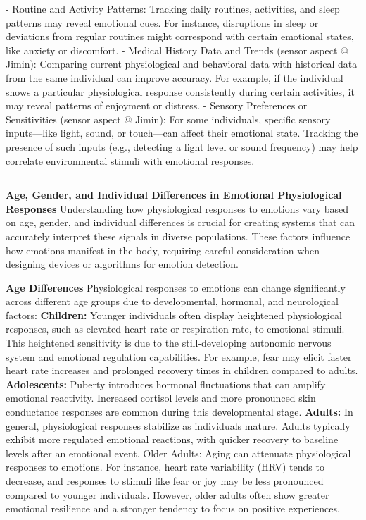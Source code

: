 \documentclass[12pt, research paper]{report}
\begin{document}
	\newline - Routine and Activity Patterns: Tracking daily routines, activities, and sleep patterns may reveal emotional cues. For instance, disruptions in sleep or deviations from regular routines might correspond with certain emotional states, like anxiety or discomfort.
	\newline - Medical History Data and Trends (sensor aspect @ Jimin): Comparing current physiological and behavioral data with historical data from the same individual can improve accuracy. For example, if the individual shows a particular physiological response consistently during certain activities, it may reveal patterns of enjoyment or distress. 
	\newline - Sensory Preferences or Sensitivities (sensor aspect @ Jimin): For some individuals, specific sensory inputs—like light, sound, or touch—can affect their emotional state. Tracking the presence of such inputs (e.g., detecting a light level or sound frequency) may help correlate environmental stimuli with emotional responses.
	
	\noindent \rule{13.85cm}{0.01cm}
	\textbf{Age, Gender, and Individual Differences in Emotional Physiological Responses}
	\newline Understanding how physiological responses to emotions vary based on age, gender, and individual differences is crucial for creating systems that can accurately interpret these signals in diverse populations. These factors influence how emotions manifest in the body, requiring careful consideration when designing devices or algorithms for emotion detection.
	\bigskip
	
	\noindent \textbf{Age Differences}
	\newline Physiological responses to emotions can change significantly across different age groups due to developmental, hormonal, and neurological factors:
	\newline \textbf{Children:} Younger individuals often display heightened physiological responses, such as elevated heart rate or respiration rate, to emotional stimuli. This heightened sensitivity is due to the still-developing autonomic nervous system and emotional regulation capabilities. For example, fear may elicit faster heart rate increases and prolonged recovery times in children compared to adults.
	\newline \textbf{Adolescents:} Puberty introduces hormonal fluctuations that can amplify emotional reactivity. Increased cortisol levels and more pronounced skin conductance responses are common during this developmental stage.
	\newline \textbf{Adults:} In general, physiological responses stabilize as individuals mature. Adults typically exhibit more regulated emotional reactions, with quicker recovery to baseline levels after an emotional event.
	Older Adults: Aging can attenuate physiological responses to emotions. For instance, heart rate variability (HRV) tends to decrease, and responses to stimuli like fear or joy may be less pronounced compared to younger individuals. However, older adults often show greater emotional resilience and a stronger tendency to focus on positive experiences.
	\bigskip 
	
\end{document}
